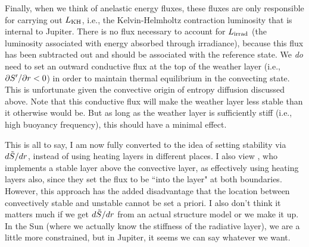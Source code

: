 \documentclass[12pt]{article}
\numberwithin{equation}{section}
\newcommand{\lumirrad}{L_{\rm irrad}}
\newcommand{\lumkh}{L_{\rm KH}}
\begin{document}
Finally, when we think of anelastic energy fluxes, these fluxes are only responsible for carrying out $\lumkh$, i.e., the Kelvin-Helmholtz contraction luminosity that is internal to Jupiter. There is no flux necessary to account for $\lumirrad$ (the luminosity associated with energy absorbed through irradiance), because this flux has been subtracted out and should be associated with the reference state. We \textit{do} need to set an outward conductive flux at the top of the weather layer (i.e., $\partial{S^\prime}/\partial r<0$) in order to maintain thermal equilibrium in the convecting state. This is unfortunate given the convective origin of entropy diffusion discussed above. Note that this conductive flux will make the weather layer less stable than it otherwise would be. But as long as the weather layer is sufficiently stiff (i.e., high buoyancy frequency), this should have a minimal effect. 

This is all to say, I am now fully converted to the idea of setting stability via $d\tilde{S}/dr$, instead of using heating layers in different places. I also view \citet{Heimpel2022}, who implements a stable layer above the convective layer, as effectively using heating layers also, since they set the flux to be ``into the layer" at both boundaries. However, this approach has the added disadvantage that the location between convectively stable and unstable cannot be set a priori. I also don't think it matters much if we get $d\tilde{S}/dr$ from an actual structure model or we make it up. In the Sun (where we actually know the stiffness of the radiative layer), we are a little more constrained, but in Jupiter, it seems we can say whatever we want. 





\end{document}
